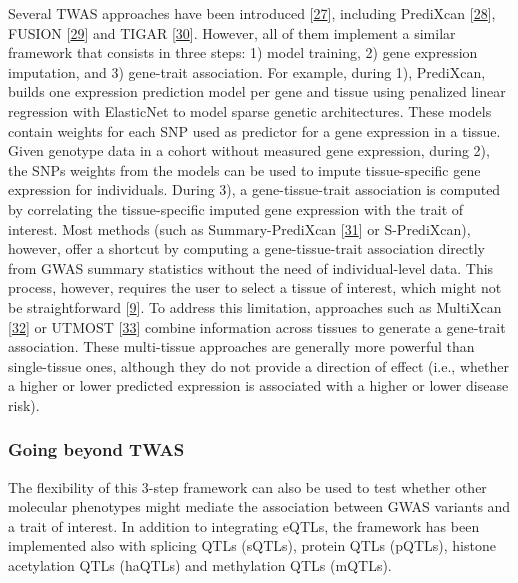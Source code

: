 Several TWAS approaches have been introduced {[}\protect\hyperlink{ref-RmhTH35O}{27}{]}, including PrediXcan {[}\protect\hyperlink{ref-Z8bvDdVq}{28}{]}, FUSION {[}\protect\hyperlink{ref-1D63fEEPb}{29}{]} and TIGAR {[}\protect\hyperlink{ref-19Klmizj8}{30}{]}.
However, all of them implement a similar framework that consists in three steps: 1) model training, 2) gene expression imputation, and 3) gene-trait association.
For example, during 1), PrediXcan, builds one expression prediction model per gene and tissue using penalized linear regression with ElasticNet to model sparse genetic architectures.
These models contain weights for each SNP used as predictor for a gene expression in a tissue.
Given genotype data in a cohort without measured gene expression, during 2), the SNPs weights from the models can be used to impute tissue-specific gene expression for individuals.
During 3), a gene-tissue-trait association is computed by correlating the tissue-specific imputed gene expression with the trait of interest.
Most methods (such as Summary-PrediXcan {[}\protect\hyperlink{ref-vLyTudUB}{31}{]} or S-PrediXcan), however, offer a shortcut by computing a gene-tissue-trait association directly from GWAS summary statistics without the need of individual-level data.
This process, however, requires the user to select a tissue of interest, which might not be straightforward {[}\protect\hyperlink{ref-l6ogswV3}{9}{]}.
To address this limitation, approaches such as MultiXcan {[}\protect\hyperlink{ref-1FFzCXo1s}{32}{]} or UTMOST {[}\protect\hyperlink{ref-93R9hBin}{33}{]} combine information across tissues to generate a gene-trait association.
These multi-tissue approaches are generally more powerful than single-tissue ones, although they do not provide a direction of effect (i.e., whether a higher or lower predicted expression is associated with a higher or lower disease risk).

\hypertarget{going-beyond-twas}{%
\subsubsection{Going beyond TWAS}\label{going-beyond-twas}}

The flexibility of this 3-step framework can also be used to test whether other molecular phenotypes might mediate the association between GWAS variants and a trait of interest.
In addition to integrating eQTLs, the framework has been implemented also with splicing QTLs (sQTLs), protein QTLs (pQTLs), histone acetylation QTLs (haQTLs) and methylation QTLs (mQTLs).

